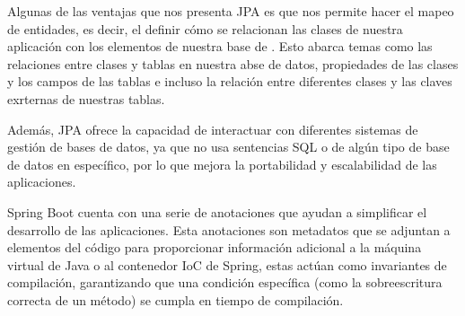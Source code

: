 Algunas de las ventajas que nos presenta JPA es que nos permite hacer el mapeo de entidades, es decir, el definir cómo se relacionan las clases de nuestra aplicación con los elementos de nuestra base de \cite{CitaAJ03}. Esto abarca temas como las relaciones entre clases y tablas en nuestra abse de datos, propiedades de las clases y los campos de las tablas e incluso la relación entre diferentes clases y las claves exrternas de nuestras tablas. 

Además, JPA ofrece la capacidad de interactuar con diferentes sistemas de gestión de bases de datos, ya que no usa sentencias SQL o de algún tipo de base de datos en específico, por lo que mejora la portabilidad y escalabilidad de las aplicaciones. \cite{CitaAJ04}

Spring Boot cuenta con una serie de anotaciones que ayudan a simplificar el desarrollo de las aplicaciones. Esta anotaciones son metadatos que se adjuntan a elementos del código para proporcionar información adicional a la máquina virtual de Java o al contenedor IoC de Spring, estas actúan como invariantes de compilación, garantizando que una condición específica (como la sobreescritura correcta de un método) se cumpla en tiempo de compilación.

